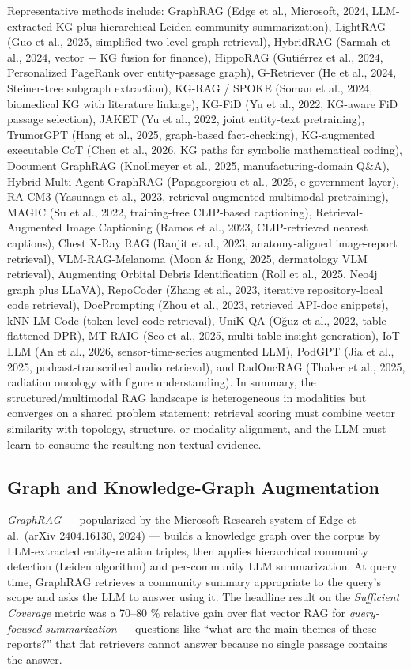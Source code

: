 Representative methods include: GraphRAG (Edge et al., Microsoft, 2024, LLM-extracted KG plus hierarchical Leiden community summarization), LightRAG (Guo et al., 2025, simplified two-level graph retrieval), HybridRAG (Sarmah et al., 2024, vector + KG fusion for finance), HippoRAG (Gutiérrez et al., 2024, Personalized PageRank over entity-passage graph), G-Retriever (He et al., 2024, Steiner-tree subgraph extraction), KG-RAG / SPOKE (Soman et al., 2024, biomedical KG with literature linkage), KG-FiD (Yu et al., 2022, KG-aware FiD passage selection), JAKET (Yu et al., 2022, joint entity-text pretraining), TrumorGPT (Hang et al., 2025, graph-based fact-checking), KG-augmented executable CoT (Chen et al., 2026, KG paths for symbolic mathematical coding), Document GraphRAG (Knollmeyer et al., 2025, manufacturing-domain Q\&A), Hybrid Multi-Agent GraphRAG (Papageorgiou et al., 2025, e-government layer), RA-CM3 (Yasunaga et al., 2023, retrieval-augmented multimodal pretraining), MAGIC (Su et al., 2022, training-free CLIP-based captioning), Retrieval-Augmented Image Captioning (Ramos et al., 2023, CLIP-retrieved nearest captions), Chest X-Ray RAG (Ranjit et al., 2023, anatomy-aligned image-report retrieval), VLM-RAG-Melanoma (Moon \& Hong, 2025, dermatology VLM retrieval), Augmenting Orbital Debris Identification (Roll et al., 2025, Neo4j graph plus LLaVA), RepoCoder (Zhang et al., 2023, iterative repository-local code retrieval), DocPrompting (Zhou et al., 2023, retrieved API-doc snippets), kNN-LM-Code (token-level code retrieval), UniK-QA (Oğuz et al., 2022, table-flattened DPR), MT-RAIG (Seo et al., 2025, multi-table insight generation), IoT-LLM (An et al., 2026, sensor-time-series augmented LLM), PodGPT (Jia et al., 2025, podcast-transcribed audio retrieval), and RadOncRAG (Thaker et al., 2025, radiation oncology with figure understanding). In summary, the structured/multimodal RAG landscape is heterogeneous in modalities but converges on a shared problem statement: retrieval scoring must combine vector similarity with topology, structure, or modality alignment, and the LLM must learn to consume the resulting non-textual evidence.

\subsection{Graph and Knowledge-Graph Augmentation}\label{graph-and-knowledge-graph-augmentation}

\emph{GraphRAG} --- popularized by the Microsoft Research system of Edge et al.~(arXiv 2404.16130, 2024) --- builds a knowledge graph over the corpus by LLM-extracted entity-relation triples, then applies hierarchical community detection (Leiden algorithm) and per-community LLM summarization. At query time, GraphRAG retrieves a community summary appropriate to the query's scope and asks the LLM to answer using it. The headline result on the \emph{Sufficient Coverage} metric was a 70--80 \% relative gain over flat vector RAG for \emph{query-focused summarization} --- questions like ``what are the main themes of these reports?'' that flat retrievers cannot answer because no single passage contains the answer.

